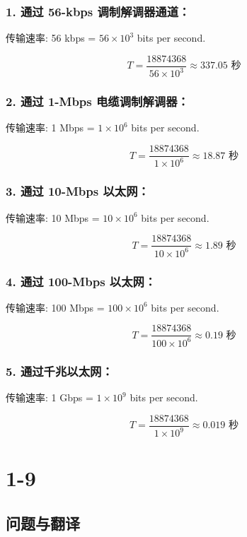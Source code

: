 \subsubsection*{1. 通过 56-kbps 调制解调器通道：}

传输速率: 56 kbps = \( 56 \times 10^3 \) bits per second.

\[
T = \frac{18874368}{56 \times 10^3} \approx 337.05 \text{ 秒}
\]

\subsubsection*{2. 通过 1-Mbps 电缆调制解调器：}

传输速率: 1 Mbps = \( 1 \times 10^6 \) bits per second.

\[
T = \frac{18874368}{1 \times 10^6} \approx 18.87 \text{ 秒}
\]

\subsubsection*{3. 通过 10-Mbps 以太网：}

传输速率: 10 Mbps = \( 10 \times 10^6 \) bits per second.

\[
T = \frac{18874368}{10 \times 10^6} \approx 1.89 \text{ 秒}
\]

\subsubsection*{4. 通过 100-Mbps 以太网：}

传输速率: 100 Mbps = \( 100 \times 10^6 \) bits per second.

\[
T = \frac{18874368}{100 \times 10^6} \approx 0.19 \text{ 秒}
\]

\subsubsection*{5. 通过千兆以太网：}

传输速率: 1 Gbps = \( 1 \times 10^9 \) bits per second.

\[
T = \frac{18874368}{1 \times 10^9} \approx 0.019 \text{ 秒}
\]

\section{1-9}

\subsection{问题与翻译}

